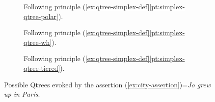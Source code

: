 \begin{figure}[H]
	\centering
	\begin{subfigure}[t]{.23\linewidth}
		\centering
		\caption{Following principle (\ref{ex:qtree-simplex-def}\ref{pt:simplex-qtree-polar}).}\label{fig:paris-qtree-polar}
	\end{subfigure}
	\hfill
	\begin{subfigure}[t]{.33\linewidth}
		\centering		{}
		\caption{Following principle (\ref{ex:qtree-simplex-def}\ref{pt:simplex-qtree-wh}).}\label{fig:paris-qtree-wh}
	\end{subfigure}
	\hfill
	\begin{subfigure}[t]{.38\linewidth}
		\centering{}
		\caption{Following principle (\ref{ex:qtree-simplex-def}\ref{pt:simplex-qtree-tiered}).}\label{fig:paris-qtree-tiered}
	\end{subfigure}
	\caption{Possible Qtrees evoked by the assertion (\ref{ex:city-assertion})=\textit{Jo grew up in Paris}.}\label{fig:paris-qtrees}
\end{figure}

